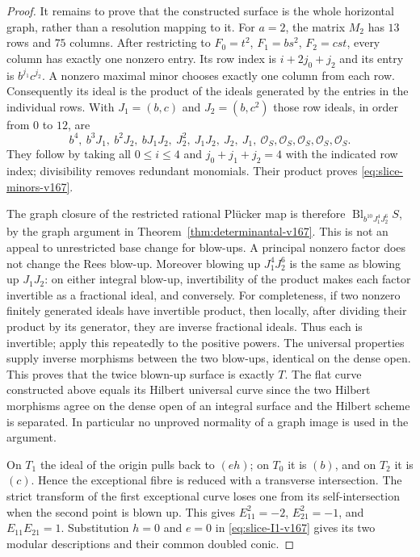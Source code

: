 \documentclass[11pt,reqno]{amsart}
\numberwithin{equation}{section}
\theoremstyle{definition}\newtheorem{definition}[theorem]{Definition}
\theoremstyle{remark}\newtheorem{remark}[theorem]{Remark}
\newcommand{\OO}{\mathcal O}\newcommand{\II}{\mathcal I}
\begin{document}
\begin{proof}
It remains to prove that the constructed surface is the whole
horizontal graph, rather than a resolution mapping to it.
For $a=2$, the matrix $M_2$ has $13$ rows and $75$ columns.
After restricting to $F_0=t^2$, $F_1=bs^2$, $F_2=cst$,
every column has exactly one nonzero entry. Its row index is
$i+2j_0+j_2$ and its entry is $b^{j_1}c^{j_2}$. A nonzero
maximal minor chooses exactly one column from each row.
Consequently its ideal is the product of the ideals generated
by the entries in the individual rows. With $J_1=(b,c)$ and
$J_2=(b,c^2)$ those row ideals, in order from $0$ to $12$, are
\[
 b^4,\ b^3J_1,\ b^2J_2,\ bJ_1J_2,\ J_2^2,\ J_1J_2,
                  \ J_2,\ J_1,\ \OO_S,\OO_S,\OO_S,\OO_S,\OO_S.
\]
They follow by taking all $0\leq i\leq4$ and
$j_0+j_1+j_2=4$ with the indicated row index; divisibility removes
redundant monomials. Their product proves
\eqref{eq:slice-minors-v167}.

The graph closure of the restricted rational Pl\"ucker map is
therefore $\operatorname{Bl}_{b^{10}J_1^4J_2^6}S$, by the graph
argument in Theorem~\ref{thm:determinantal-v167}. This is not an
appeal to unrestricted base change for blow-ups. A principal
nonzero factor does not change the Rees blow-up. Moreover blowing
up $J_1^4J_2^6$ is the same as blowing up $J_1J_2$: on either
integral blow-up, invertibility of the product makes each factor
invertible as a fractional ideal, and conversely. For completeness,
if two nonzero finitely generated ideals have invertible product,
then locally, after dividing their product by its generator, they
are inverse fractional ideals. Thus each is invertible; apply
this repeatedly to the positive powers. The universal properties
supply inverse morphisms between the two blow-ups, identical on
the dense open. This proves that the twice blown-up surface is
exactly $T$. The flat curve constructed above equals its Hilbert
universal curve since the two Hilbert morphisms agree on the
dense open of an integral surface and the Hilbert scheme is
separated. In particular no unproved normality of a graph image
is used in the argument.

On $T_1$ the ideal of the origin pulls back to $(eh)$; on $T_0$
it is $(b)$, and on $T_2$ it is $(c)$. Hence the exceptional fibre
is reduced with a transverse intersection. The strict transform
of the first exceptional curve loses one from its self-intersection
when the second point is blown up. This gives $E_{11}^2=-2$,
$E_{21}^2=-1$, and $E_{11}E_{21}=1$. Substitution $h=0$ and $e=0$
in \eqref{eq:slice-I1-v167} gives its two modular descriptions and
their common doubled conic.
\end{proof}
\end{document}
